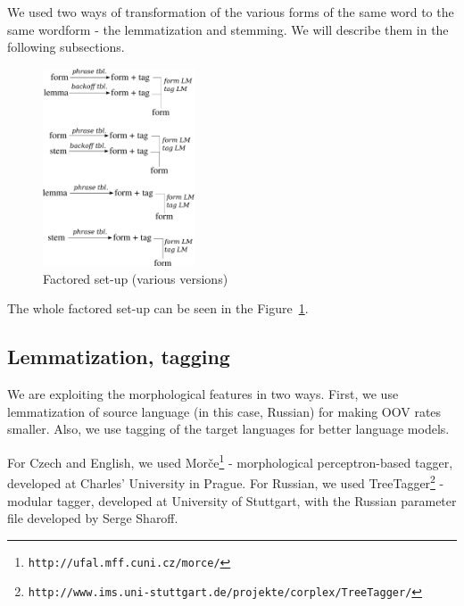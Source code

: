 \documentclass[11pt,letterpaper]{article}
\begin{document}
We used two ways of transformation of the various forms of the same word to the same wordform - the lemmatization and stemming. We will describe them in the following subsections.

\begin{figure}
\centering
\includegraphics[width=0.4\textwidth]{graf_moses}
\caption{Factored set-up (various versions)}
\label{graf:mss}
\end{figure}

The whole factored set-up can be seen in the Figure~\ref{graf:mss}.

\subsection{Lemmatization, tagging}



We are exploiting the morphological features in two ways. First, we use lemmatization of source language (in this case, Russian) for making OOV rates smaller. Also, we use tagging of the target languages for better language models.

For Czech and English, we used Morče\footnote{\texttt{http://ufal.mff.cuni.cz/morce/}} - morphological perceptron-based tagger, developed at Charles' University in Prague. For Russian, we used TreeTagger\footnote{\texttt{http://www.ims.uni-stuttgart.de/\-projekte/corplex/TreeTagger/}} - modular tagger, developed at University of Stuttgart, with the Russian parameter file developed by Serge Sharoff.
\end{document}
